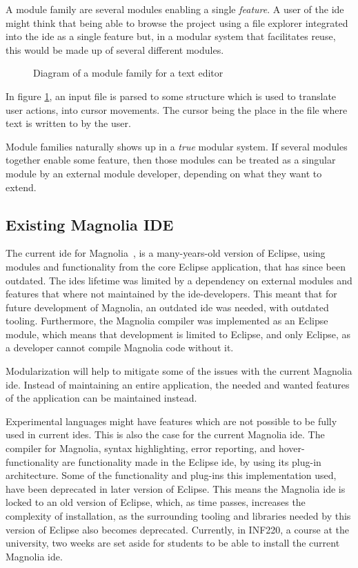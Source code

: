 A module family are several modules enabling a single
\textit{feature}. A user of the \gls*{ide} might think that being able to browse
the project using a file explorer integrated into the \gls*{ide} as a single
feature but, in a modular system that facilitates reuse, this would be made up
of several different modules.

\begin{figure}[H]
  \centering
  
  \caption{Diagram of a module family for a text editor}
  \label{fig:textEditorSimple}
\end{figure}

In figure \ref{fig:textEditorSimple}, an input file is parsed to some structure
which is used to translate user actions, into cursor movements. The cursor being
the place in the file where text is written to by the user.

Module families naturally shows up in a \textit{true} modular system. If
several modules together enable some feature, then those modules can be treated
as a singular module by an external module developer, depending on what they
want to extend.


\subsection{Existing Magnolia IDE}

The current \gls*{ide} for Magnolia~\cite{baggeIde}, is a many-years-old version
of Eclipse, using modules and functionality from the core Eclipse application,
that has since been outdated. The \gls*{ide}s lifetime was limited by a
dependency on external modules and features that where not maintained by the
\gls*{ide}-developers. This meant that for future development of Magnolia, an
outdated \gls*{ide} was needed, with outdated tooling. Furthermore, the Magnolia
compiler was implemented as an Eclipse module, which means that development is
limited to Eclipse, and only Eclipse, as a developer cannot compile Magnolia
code without it.

Modularization will help to mitigate some of the issues with the current
Magnolia \gls*{ide}. Instead of maintaining an entire application, the needed and
wanted features of the application can be maintained instead.

Experimental languages might have features which are not possible to be fully
used in current \gls*{ide}s. This is also the case for the current Magnolia
\gls*{ide}. The compiler for Magnolia, syntax highlighting, error reporting, and
hover-functionality are functionality made in the Eclipse \gls*{ide}, by using
its plug-in architecture. Some of the functionality and plug-ins this
implementation used, have been deprecated in later version of Eclipse. This
means the Magnolia \gls*{ide} is locked to an old version of Eclipse, which, as
time passes, increases the complexity of installation, as the surrounding
tooling and libraries needed by this version of Eclipse also becomes deprecated.
Currently, in INF220, a course at the university, two weeks are set aside for
students to be able to install the current Magnolia \gls*{ide}.


